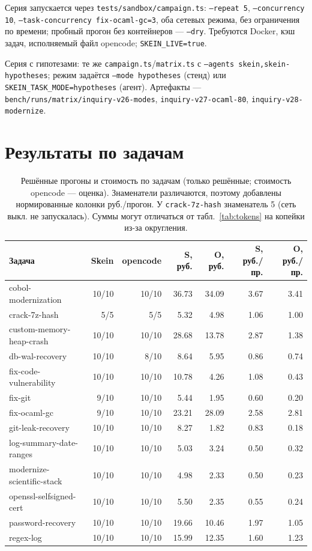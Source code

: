 \documentclass[11pt,a4paper]{article}
\begin{document}
Серия запускается через \texttt{tests/sandbox/campaign.ts}: \texttt{--repeat 5},
\texttt{--concurrency 10}, \texttt{--task-concurrency fix-ocaml-gc=3}, оба сетевых режима,
без ограничения по времени; пробный прогон без контейнеров --- \texttt{--dry}. Требуются
Docker, кэш задач, исполняемый файл opencode; \texttt{SKEIN\_LIVE=true}.

Серия с гипотезами: те же \texttt{campaign.ts}/\texttt{matrix.ts} с
\texttt{--agents skein,skein-hypotheses}; режим задаётся \texttt{--mode hypotheses} (стенд)
или \texttt{SKEIN\_TASK\_MODE=hypotheses} (агент). Артефакты ---
\texttt{bench/runs/matrix/inquiry-v26-modes},
\texttt{inquiry-v27-ocaml-80}, \texttt{inquiry-v28-modernize}.

\section{Результаты по задачам}

\begin{table}[h]
\centering
\small
\caption{Решённые прогоны и стоимость по задачам (только решённые; стоимость opencode ---
оценка). Знаменатели различаются, поэтому добавлены нормированные колонки руб./прогон.
У \texttt{crack-7z-hash} знаменатель 5 (сеть выкл. не запускалась). Суммы могут отличаться
от табл.~\ref{tab:tokens} на копейки из-за округления.}
\label{tab:pertask}
\begin{tabular}{@{}lrrrrrr@{}}
\toprule
Задача & Skein & opencode & S, руб. & O, руб. & S, руб./пр. & O, руб./пр. \\
\midrule
cobol-modernization & 10/10 & 10/10 & 36.73 & 34.09 & 3.67 & 3.41 \\
crack-7z-hash & 5/5 & 5/5 & 5.32 & 4.98 & 1.06 & 1.00 \\
custom-memory-heap-crash & 10/10 & 10/10 & 28.68 & 13.78 & 2.87 & 1.38 \\
db-wal-recovery & 10/10 & 8/10 & 8.64 & 5.95 & 0.86 & 0.74 \\
fix-code-vulnerability & 10/10 & 10/10 & 10.78 & 4.26 & 1.08 & 0.43 \\
fix-git & 9/10 & 10/10 & 5.44 & 1.95 & 0.60 & 0.20 \\
fix-ocaml-gc & 9/10 & 10/10 & 23.21 & 28.09 & 2.58 & 2.81 \\
git-leak-recovery & 10/10 & 10/10 & 8.27 & 1.82 & 0.83 & 0.18 \\
log-summary-date-ranges & 10/10 & 10/10 & 5.03 & 3.24 & 0.50 & 0.32 \\
modernize-scientific-stack & 10/10 & 10/10 & 4.98 & 2.33 & 0.50 & 0.23 \\
openssl-selfsigned-cert & 10/10 & 10/10 & 5.50 & 2.35 & 0.55 & 0.24 \\
password-recovery & 10/10 & 10/10 & 19.66 & 10.46 & 1.97 & 1.05 \\
regex-log & 10/10 & 10/10 & 15.99 & 12.35 & 1.60 & 1.23 \\
\bottomrule
\end{tabular}
\end{table}

\clearpage


\end{document}
